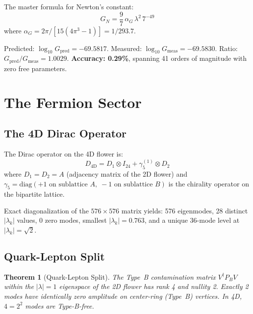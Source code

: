 \documentclass[12pt,a4paper]{article}
\theoremstyle{plain}
\newtheorem{theorem}{Theorem}[section]
\theoremstyle{definition}
\begin{document}
The master formula for Newton's constant:
\begin{equation}\label{eq:GN}
\boxed{G_N = \frac{9}{7}\,\alpha_G\,\lambda^2\,7^{-49}}
\end{equation}
where $\alpha_G = 2\pi/[15(4\pi^3 - 1)] = 1/293.7$.

Predicted: $\log_{10} G_{\mathrm{pred}} = -69.5817$. Measured: $\log_{10} G_{\mathrm{meas}} = -69.5830$. Ratio: $G_{\mathrm{pred}}/G_{\mathrm{meas}} = 1.0029$. \textbf{Accuracy: 0.29\%}, spanning 41 orders of magnitude with zero free parameters.

\section{The Fermion Sector}\label{sec:fermions}

\subsection{The 4D Dirac Operator}

The Dirac operator on the 4D flower is:
\begin{equation}\label{eq:dirac4d}
D_{4\mathrm{D}} = D_1 \otimes I_{24} + \gamma_5^{(1)} \otimes D_2
\end{equation}
where $D_1 = D_2 = A$ (adjacency matrix of the 2D flower) and $\gamma_5 = \mathrm{diag}(+1 \text{ on sublattice } A,\; -1 \text{ on sublattice } B)$ is the chirality operator on the bipartite lattice.

Exact diagonalization of the $576 \times 576$ matrix yields: 576 eigenmodes, 28 distinct $|\lambda_k|$ values, 0 zero modes, smallest $|\lambda_k| = 0.763$, and a unique 36-mode level at $|\lambda_k| = \sqrt{2}$.

\subsection{Quark-Lepton Split}

\begin{theorem}[Quark-Lepton Split]\label{thm:ql-split}
The Type~B contamination matrix $V^\dagger P_B V$ within the $|\lambda| = 1$ eigenspace of the 2D flower has rank 4 and nullity 2. Exactly 2 modes have identically zero amplitude on center-ring (Type~B) vertices. In 4D, $4 = 2^2$ modes are Type-B-free.
\end{theorem}
\end{document}

